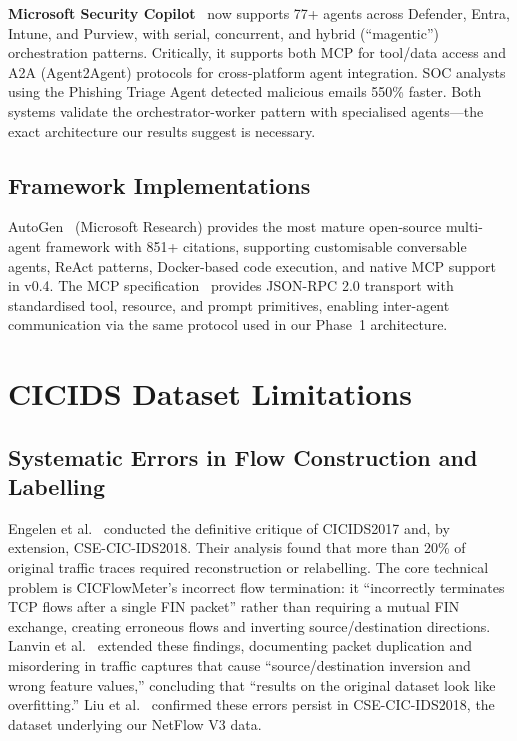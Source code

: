\documentclass[12pt, a4paper, oneside]{report}
\begin{document}
\textbf{Microsoft Security Copilot}~\cite{microsoft2025copilot} now supports 77+
agents across Defender, Entra, Intune, and Purview, with serial, concurrent, and
hybrid (``magentic'') orchestration patterns. Critically, it supports both MCP for
tool/data access and A2A (Agent2Agent) protocols for cross-platform agent
integration. SOC analysts using the Phishing Triage Agent detected malicious emails
550\% faster. Both systems validate the orchestrator-worker pattern with specialised
agents---the exact architecture our results suggest is necessary.

\subsection{Framework Implementations}

AutoGen~\cite{wu2023autogen} (Microsoft Research) provides the most mature
open-source multi-agent framework with 851+ citations, supporting customisable
conversable agents, ReAct patterns, Docker-based code execution, and native MCP
support in v0.4. The MCP specification~\cite{mcp2024spec} provides JSON-RPC 2.0
transport with standardised tool, resource, and prompt primitives, enabling
inter-agent communication via the same protocol used in our Phase~1 architecture.


\section{CICIDS Dataset Limitations}
\label{sec:cicids-limitations}

\subsection{Systematic Errors in Flow Construction and Labelling}

Engelen et al.~\cite{engelen2021cicids} conducted the definitive critique of
CICIDS2017 and, by extension, CSE-CIC-IDS2018. Their analysis found that more than
20\% of original traffic traces required reconstruction or relabelling. The core
technical problem is CICFlowMeter's incorrect flow termination: it ``incorrectly
terminates TCP flows after a single FIN packet'' rather than requiring a mutual FIN
exchange, creating erroneous flows and inverting source/destination directions.
Lanvin et al.~\cite{lanvin2023errors} extended these findings, documenting packet
duplication and misordering in traffic captures that cause ``source/destination
inversion and wrong feature values,'' concluding that ``results on the original
dataset look like overfitting.'' Liu et al.~\cite{liu2022errors} confirmed these
errors persist in CSE-CIC-IDS2018, the dataset underlying our NetFlow V3 data.
\end{document}
